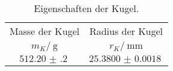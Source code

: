 \begin{table}[H]
	\centering
	\begin{tabular}{cc}
		\toprule
		{Masse der Kugel} & {Radius der Kugel} \\
		{$m_K/\:\si{\gram}$} & {$r_K/\:\si{\milli\meter}$}\\
		\midrule
			$\SI{512.20(20)}{}$& $\SI{25.3800(18)}{}$\\
		\bottomrule
	\end{tabular}
	\caption{Eigenschaften der Kugel. \cite{V102}}
	\label{tab:kugel}
\end{table}